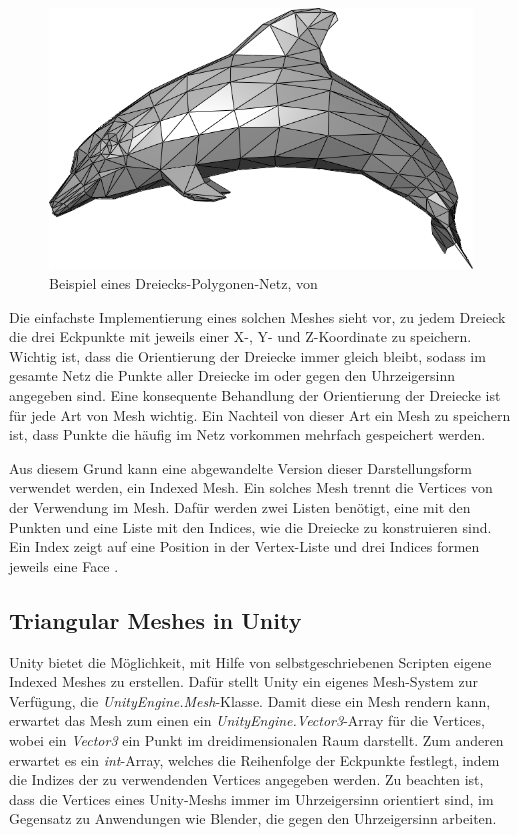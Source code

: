 \begin{figure}[h]
	\centering
	\includegraphics[width=0.7\linewidth]{Images/Dolphin_triangle_mesh}
	\caption[Beispiel eines Polygonen-Netzes]{Beispiel eines Dreiecks-Polygonen-Netz, von \cite{WikipediaDolphin1}}
	\label{fig:dolphintrianglemesh}
\end{figure}


Die einfachste Implementierung eines solchen Meshes sieht vor, zu jedem Dreieck die drei Eckpunkte mit jeweils einer X-, Y- und Z-Koordinate zu speichern. Wichtig ist, dass die Orientierung der Dreiecke immer gleich bleibt, sodass im gesamte Netz die Punkte aller Dreiecke im oder gegen den Uhrzeigersinn angegeben sind. Eine konsequente Behandlung der Orientierung der Dreiecke ist f\"ur jede Art von Mesh wichtig. Ein Nachteil von dieser Art ein Mesh zu speichern ist, dass Punkte die h\"aufig im Netz vorkommen mehrfach gespeichert werden. 

Aus diesem Grund kann eine abgewandelte Version dieser Darstellungsform verwendet werden, ein Indexed Mesh. Ein solches Mesh trennt die Vertices von der Verwendung im Mesh. Daf\"ur werden zwei Listen ben\"otigt, eine mit den Punkten und eine Liste mit den Indices, wie die Dreiecke zu konstruieren sind. Ein Index zeigt auf eine Position in der Vertex-Liste und drei Indices formen jeweils eine Face \cite[S.265]{Shirley2010}.

\subsection{Triangular Meshes in Unity}
Unity bietet die M\"oglichkeit, mit Hilfe von selbstgeschriebenen Scripten eigene Indexed Meshes zu erstellen. Daf\"ur stellt Unity ein eigenes Mesh-System zur Verf\"ugung, die \textit{UnityEngine.Mesh}-Klasse. Damit diese ein Mesh rendern kann, erwartet das Mesh zum einen ein \textit{UnityEngine.Vector3}-Array f\"ur die Vertices, wobei ein \textit{Vector3} ein Punkt im dreidimensionalen Raum darstellt. Zum anderen erwartet es ein \textit{int}-Array, welches die Reihenfolge der Eckpunkte festlegt, indem die Indizes der zu verwendenden Vertices angegeben werden. Zu beachten ist, dass die Vertices eines Unity-Meshs immer im Uhrzeigersinn orientiert sind, im Gegensatz zu Anwendungen wie Blender, die gegen den Uhrzeigersinn arbeiten.
  
